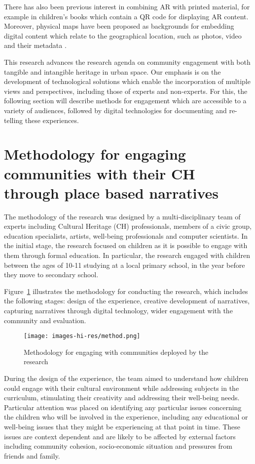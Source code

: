 \documentclass{egpubl}
\begin{document}
There has also been previous interest in combining AR with printed material,
for example in children's books which contain a QR code for displaying AR
content. Moreover, physical maps have been proposed as backgrounds for
embedding digital content which relate to the geographical location, such as
photos, video and their metadata \cite{Morrison:2009:LBA:1518701.1518991,
Terracciano:2017:MMR:3027063.3052958}.

This research advances the research agenda on community engagement with both
tangible and intangible heritage in urban space. Our emphasis is on the
development of technological solutions which enable the incorporation of multiple
views and perspectives, including those of experts and non-experts. For this,
the following section will  describe methods for engagement which are
accessible to a variety of audiences, followed by digital technologies for
documenting and re-telling these experiences. 


\section{Methodology for engaging communities with their CH through place
based narratives} 
\label{meth} The methodology of the research was designed by
a multi-disciplinary team of experts including Cultural Heritage (CH)
professionals, members of a civic group, education specialists, artists,
well-being professionals and computer scientists. In the initial stage, the
research focused on children as it is possible to engage with them through
formal education. In particular, the research engaged with children between
the ages of 10-11 studying at a local primary school, in the year before they
move to secondary school.

Figure~\ref{fig:method} illustrates the methodology for conducting the
research, which includes the following stages: design of the experience,
creative development of narratives, capturing narratives through digital
technology, wider engagement with the community and evaluation.


\begin{figure}[ht] \centering
\texttt{[image: images-hi-res/method.png]}
\caption{Methodology for engaging with communities deployed by the research}
\label{fig:method} \end{figure}

During the design of the experience, the team aimed to understand how children
could engage with their cultural environment while addressing subjects in the
curriculum, stimulating their creativity and addressing their well-being
needs. Particular attention was placed on identifying any particular issues
concerning the children who will be involved in the experience, including any
educational or well-being issues that they might be experiencing at that point
in time. These issues are context dependent and are likely to be affected by
external factors including community cohesion, socio-economic situation and
pressures from friends and family.
\end{document}
